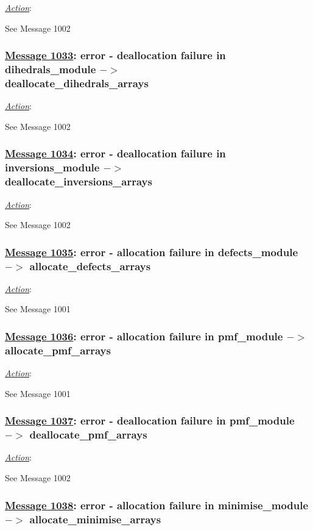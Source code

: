 \noindent \underline{\em Action}:

See Message 1002

\subsubsection*{\underline{Message 1033}: error - deallocation failure in dihedrals\_module $->$ \\
\noindent deallocate\_dihedrals\_arrays}

\noindent \underline{\em Action}:

See Message 1002

\subsubsection*{\underline{Message 1034}: error - deallocation failure in inversions\_module $->$ \\
\noindent deallocate\_inversions\_arrays}

\noindent \underline{\em Action}:

See Message 1002

\subsubsection*{\underline{Message 1035}: error - allocation failure in defects\_module $->$ allocate\_defects\_arrays}

\noindent \underline{\em Action}:

See Message 1001

\subsubsection*{\underline{Message 1036}: error - allocation failure in pmf\_module $->$ allocate\_pmf\_arrays}

\noindent \underline{\em Action}:

See Message 1001

\subsubsection*{\underline{Message 1037}: error - deallocation failure in pmf\_module $->$ deallocate\_pmf\_arrays}

\noindent \underline{\em Action}:

See Message 1002

\subsubsection*{\underline{Message 1038}: error - allocation failure in minimise\_module $->$ allocate\_minimise\_arrays}

